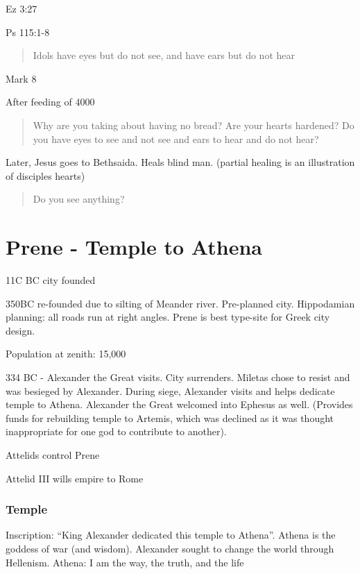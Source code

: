 \documentclass[
]{book}
\begin{document}
Ez 3:27

Ps 115:1-8

\begin{quote}
Idols have eyes but do not see, and have ears but do not hear
\end{quote}

Mark 8

After feeding of 4000

\begin{quote}
Why are you taking about having no bread? Are your hearts hardened? Do you have eyes to see and not see and ears to hear and do not hear?
\end{quote}

Later, Jesus goes to Bethsaida. Heals blind man. (partial healing is an illustration of disciples hearts)

\begin{quote}
Do you see anything?
\end{quote}

\hypertarget{prene---temple-to-athena}{%
\chapter{Prene - Temple to Athena}\label{prene---temple-to-athena}}

11C BC city founded

350BC re-founded due to silting of Meander river. Pre-planned city. Hippodamian planning: all roads run at right angles. Prene is best type-site for Greek city design.

Population at zenith: 15,000

334 BC - Alexander the Great visits. City surrenders. Miletas chose to resist and was besieged by Alexander. During siege, Alexander visits and helps dedicate temple to Athena. Alexander the Great welcomed into Ephesus as well. (Provides funds for rebuilding temple to Artemis, which was declined as it was thought inappropriate for one god to contribute to another).

Attelids control Prene

Attelid III wills empire to Rome

\hypertarget{temple}{%
\subsection{Temple}\label{temple}}

Inscription: ``King Alexander dedicated this temple to Athena''. Athena is the goddess of war (and wisdom). Alexander sought to change the world through Hellenism. Athena: I am the way, the truth, and the life
\end{document}
